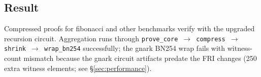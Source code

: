 \subsection{Result}

Compressed proofs for fibonacci and other benchmarks verify with the
upgraded recursion circuit.  Aggregation runs through
\texttt{prove\_core $\to$ compress $\to$ shrink $\to$ wrap\_bn254}
successfully; the gnark BN254 wrap fails with witness-count mismatch
because the gnark circuit artifacts predate the FRI changes (250
extra witness elements; see \S\ref{sec:performance}).
